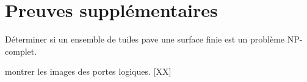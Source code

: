 \appendix 
{}

\chapter{Preuves supplémentaires}

\begin{proposition}
Déterminer si un ensemble de tuiles pave une surface finie est un problème NP-complet.
\end{proposition}

\begin{preuve}
montrer les images des portes logiques. [XX]
\end{preuve}

